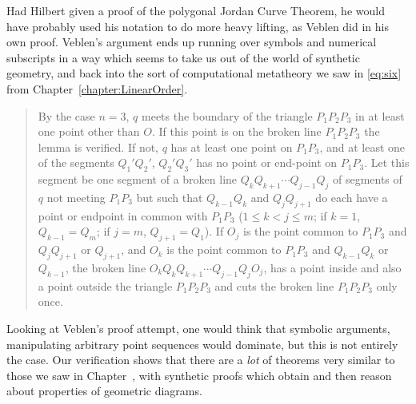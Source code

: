 Had Hilbert given a proof of the polygonal Jordan Curve Theorem, he would have probably used his notation to do more heavy lifting, as Veblen did in his own proof. Veblen's argument ends up running over symbols and numerical subscripts in a way which seems to take us out of the world of synthetic geometry, and back into the sort of computational metatheory we saw in \ref{eq:six} from Chapter~\ref{chapter:LinearOrder}.
\begin{quotation}
  By the case $n=3$, $q$ meets the boundary of the triangle $P_1P_2P_3$ in at least one point other than $O$. If this point is on the broken line $P_1P_2P_3$ the lemma is verified. If not, $q$ has at least one point on $P_1P_3$, and at least one of the segments $Q_1'Q_2'$, $Q_2'Q_3'$ has no point or end-point on $P_1P_3$. Let this segment be one segment of a broken line $Q_kQ_{k+1}\cdots Q_{j-1}Q_j$ of segments of $q$ not meeting $P_1P_3$ but such that $Q_{k-1}Q_k$ and $Q_jQ_{j+1}$ do each have a point or endpoint in common with $P_1P_3$ ($1 \leq k < j \leq m$; if $k = 1$, $Q_{k-1} = Q_m$; if $j = m$, $Q_{j+1} = Q_1$). If $O_j$ is the point common to $P_1P_3$ and $Q_jQ_{j+1}$ or $Q_{j+1}$, and $O_k$ is the point common to $P_1P_3$ and $Q_{k-1}Q_k$ or $Q_{k-1}$, the broken line $O_kQ_kQ_{k+1}\cdots Q_{j-1}Q_jO_j$, has a point inside and also a point outside the triangle $P_1P_2P_3$ and cuts the broken line $P_1P_2P_3$ only once.
\end{quotation}
Looking at Veblen's proof attempt, one would think that symbolic arguments, manipulating arbitrary point sequences would dominate, but this is not entirely the case. Our verification shows that there are a \emph{lot} of theorems very similar to those we saw in Chapter~\cite{chapter:Group2Eval}, with synthetic proofs which obtain and then reason about properties of geometric diagrams.



